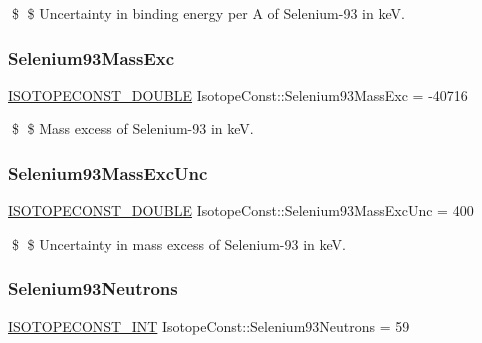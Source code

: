 \$ \$ Uncertainty in binding energy per A of Selenium-\/93 in keV. \mbox{\label{group___isotope_const-_selenium-_se93_ga9ef28cd919889f0cc5aec0105d39aa93}} 
\subsubsection{\texorpdfstring{Selenium93\+Mass\+Exc}{Selenium93MassExc}}
{\footnotesize\ttfamily \mbox{\hyperlink{group___isotope_const-_macros_ga8f45a7272ce02c0b4c65c44636ed719a}{I\+S\+O\+T\+O\+P\+E\+C\+O\+N\+S\+T\+\_\+\+D\+O\+U\+B\+LE}} Isotope\+Const\+::\+Selenium93\+Mass\+Exc = -\/40716}

\$ \$ Mass excess of Selenium-\/93 in keV. \mbox{\label{group___isotope_const-_selenium-_se93_gaed763bdf01d61b63ee410a629016000b}} 
\subsubsection{\texorpdfstring{Selenium93\+Mass\+Exc\+Unc}{Selenium93MassExcUnc}}
{\footnotesize\ttfamily \mbox{\hyperlink{group___isotope_const-_macros_ga8f45a7272ce02c0b4c65c44636ed719a}{I\+S\+O\+T\+O\+P\+E\+C\+O\+N\+S\+T\+\_\+\+D\+O\+U\+B\+LE}} Isotope\+Const\+::\+Selenium93\+Mass\+Exc\+Unc = 400}

\$ \$ Uncertainty in mass excess of Selenium-\/93 in keV. \mbox{\label{group___isotope_const-_selenium-_se93_gaa3960479e94084e73f1d31fe524edd08}} 
\subsubsection{\texorpdfstring{Selenium93\+Neutrons}{Selenium93Neutrons}}
{\footnotesize\ttfamily \mbox{\hyperlink{group___isotope_const-_macros_ga5f18360b3e99483a35c32d789e62621c}{I\+S\+O\+T\+O\+P\+E\+C\+O\+N\+S\+T\+\_\+\+I\+NT}} Isotope\+Const\+::\+Selenium93\+Neutrons = 59}

